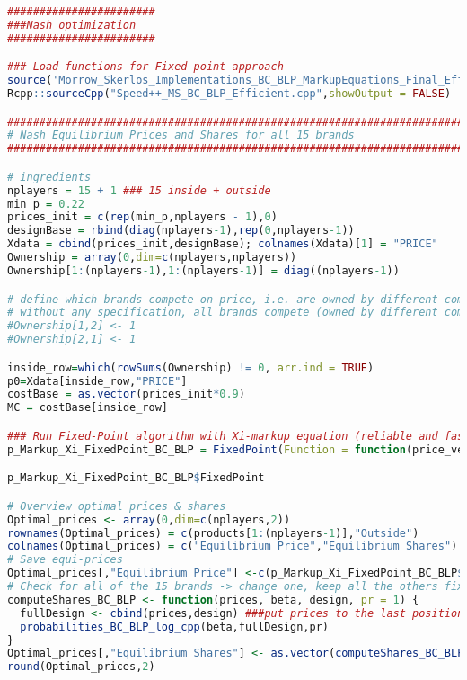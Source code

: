 \begin{lstlisting}[language=R,caption={Computing dynamic Nash equilibria in different competitive scenarios via the fixed point algorithm}, label=lst_nash_esti]
#######################  
###Nash optimization
#######################

### Load functions for Fixed-point approach
source('Morrow_Skerlos_Implementations_BC_BLP_MarkupEquations_Final_Efficient.R')
Rcpp::sourceCpp("Speed++_MS_BC_BLP_Efficient.cpp",showOutput = FALSE)

###########################################################################
# Nash Equilibrium Prices and Shares for all 15 brands
###########################################################################

# ingredients
nplayers = 15 + 1 ### 15 inside + outside
min_p = 0.22
prices_init = c(rep(min_p,nplayers - 1),0)
designBase = rbind(diag(nplayers-1),rep(0,nplayers-1))
Xdata = cbind(prices_init,designBase); colnames(Xdata)[1] = "PRICE" 
Ownership = array(0,dim=c(nplayers,nplayers))
Ownership[1:(nplayers-1),1:(nplayers-1)] = diag((nplayers-1))

# define which brands compete on price, i.e. are owned by different companies
# without any specification, all brands compete (owned by different companies)
#Ownership[1,2] <- 1
#Ownership[2,1] <- 1

inside_row=which(rowSums(Ownership) != 0, arr.ind = TRUE)
p0=Xdata[inside_row,"PRICE"]
costBase = as.vector(prices_init*0.9)
MC = costBase[inside_row]

### Run Fixed-Point algorithm with Xi-markup equation (reliable and fast: See Table 3 in paper for comparison)
p_Markup_Xi_FixedPoint_BC_BLP = FixedPoint(Function = function(price_vec) FixedPoint_BLP_Xi(price_vec,MC=MC, ownership=Ownership,Xdata=Xdata,beta_draws=beta_BC_LLMns,pr=1), Inputs = p0, MaxIter = 10000, ConvergenceMetricThreshold = 1e-10, Method = "Anderson")

p_Markup_Xi_FixedPoint_BC_BLP$FixedPoint

# Overview optimal prices & shares
Optimal_prices <- array(0,dim=c(nplayers,2))
rownames(Optimal_prices) = c(products[1:(nplayers-1)],"Outside")
colnames(Optimal_prices) = c("Equilibrium Price","Equilibrium Shares")
# Save equi-prices
Optimal_prices[,"Equilibrium Price"] <-c(p_Markup_Xi_FixedPoint_BC_BLP$FixedPoint,0)
# Check for all of the 15 brands -> change one, keep all the others fixed
computeShares_BC_BLP <- function(prices, beta, design, pr = 1) {
  fullDesign <- cbind(prices,design) ###put prices to the last position here
  probabilities_BC_BLP_log_cpp(beta,fullDesign,pr)
}
Optimal_prices[,"Equilibrium Shares"] <- as.vector(computeShares_BC_BLP(Optimal_prices[,"Equilibrium Price"], beta_BC_LLMns,designBase,pr=1))
round(Optimal_prices,2)


\end{lstlisting}
